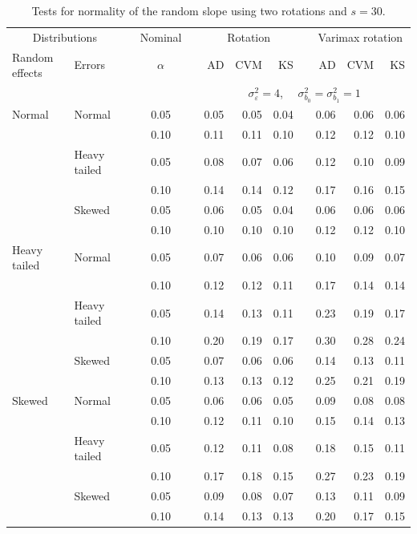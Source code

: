 \documentclass[12pt]{article} %
\begin{document}
\begin{table}[ht]
\caption{Tests for normality of the random slope using two rotations and $s = 30$.}
\begin{scriptsize}
\begin{center}
\begin{tabular}{ll p{.1cm} c p{.1cm} rrr p{.1cm} rrr}
  \hline
  \multicolumn{2}{c}{Distributions}& & Nominal & &  \multicolumn{3}{c}{Rotation} & & \multicolumn{3}{c}{Varimax rotation} \\ \cline{1-2} \cline{6-8} \cline{10-12}   
  Random effects & Errors & & $\alpha$ & & AD & CVM & KS & & AD & CVM & KS \\ 
   \hline
& && && \multicolumn{7}{c}{$\sigma_{\varepsilon}^2 = 4$, \ \ $\sigma_{b_0}^2 = \sigma_{b_1}^2 = 1$} \\ \cline{6-12}
Normal       & Normal       && 0.05 &&  0.05 & 0.05 & 0.04 && 0.06 & 0.06 & 0.06 \\ 
             &              && 0.10 &&  0.11 & 0.11 & 0.10 && 0.12 & 0.12 & 0.10 \\ 
             & Heavy tailed && 0.05 &&  0.08 & 0.07 & 0.06 && 0.12 & 0.10 & 0.09 \\ 
             &              && 0.10 &&  0.14 & 0.14 & 0.12 && 0.17 & 0.16 & 0.15 \\ 
             & Skewed       && 0.05 &&  0.06 & 0.05 & 0.04 && 0.06 & 0.06 & 0.06 \\ 
             &              && 0.10 &&  0.10 & 0.10 & 0.10 && 0.12 & 0.12 & 0.10 \\ 
Heavy tailed & Normal       && 0.05 &&  0.07 & 0.06 & 0.06 && 0.10 & 0.09 & 0.07 \\ 
             &              && 0.10 &&  0.12 & 0.12 & 0.11 && 0.17 & 0.14 & 0.14 \\ 
             & Heavy tailed && 0.05 &&  0.14 & 0.13 & 0.11 && 0.23 & 0.19 & 0.17 \\ 
             &              && 0.10 &&  0.20 & 0.19 & 0.17 && 0.30 & 0.28 & 0.24 \\ 
             & Skewed       && 0.05 &&  0.07 & 0.06 & 0.06 && 0.14 & 0.13 & 0.11 \\ 
             &              && 0.10 &&  0.13 & 0.13 & 0.12 && 0.25 & 0.21 & 0.19 \\ 
Skewed       & Normal       && 0.05 &&  0.06 & 0.06 & 0.05 && 0.09 & 0.08 & 0.08 \\ 
             &              && 0.10 &&  0.12 & 0.11 & 0.10 && 0.15 & 0.14 & 0.13 \\ 
             & Heavy tailed && 0.05 &&  0.12 & 0.11 & 0.08 && 0.18 & 0.15 & 0.11 \\ 
             &              && 0.10 &&  0.17 & 0.18 & 0.15 && 0.27 & 0.23 & 0.19 \\ 
             & Skewed       && 0.05 &&  0.09 & 0.08 & 0.07 && 0.13 & 0.11 & 0.09 \\ 
             &              && 0.10 &&  0.14 & 0.13 & 0.13 && 0.20 & 0.17 & 0.15 \\ 


\end{tabular}
\end{center}
\end{scriptsize}
\end{table}
\end{document}
